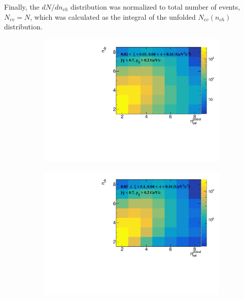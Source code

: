 Finally, the $dN/dn_{ch}$ distribution was normalized to total number of events, $N_{ev}=N$, which was calculated as the integral of the unfolded $N_{ev}(n_{ch})$ distribution.
\captionsetup{format=plain,indention=0pt,justification=justified}
\begin{figure}[h!]
	\centering
	\begin{subfigure}{.49\textwidth}
		\includegraphics[width=\textwidth,page=1]{chapters/chrgSTAR/img/unfolding/matrix_0.pdf}
	\end{subfigure}
	\begin{subfigure}{.49\textwidth}
		\includegraphics[width=\textwidth,page=1]{chapters/chrgSTAR/img/unfolding/matrix_1.pdf}
	\end{subfigure}
	\begin{subfigure}{.49\textwidth}

\end{subfigure}
\end{figure}
